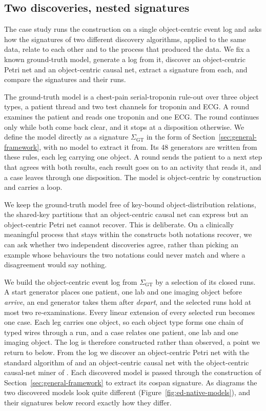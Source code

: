 \subsection{Two discoveries, nested signatures}\label{subsec:recovery}

The case study runs the construction on a single object-centric event log and asks
how the signatures of two different discovery algorithms, applied to the same data, relate to each
other and to the process that produced the data. We fix a known ground-truth model, generate a log
from it, discover an object-centric Petri net and an object-centric causal net, extract a signature
from each, and compare the signatures and their runs.

The ground-truth model is a chest-pain serial-troponin rule-out over three object types, a
patient thread and two test channels for troponin and ECG. A round examines the patient and reads one
troponin and one ECG. The round continues only while both come back clear, and it stops at a
disposition otherwise. We define the model directly as a signature $\Sigma_{\mathrm{GT}}$ in the form of
Section~\ref{sec:general-framework}, with no model to extract it from. Its 48 generators are written
from these rules, each leg carrying one object. A round sends the patient to a next step that agrees
with both results, each result goes on to an activity that reads it, and a case leaves through one
disposition. The model is object-centric by construction and carries a loop.

We keep the ground-truth model free of key-bound object-distribution relations, the
shared-key partitions that an object-centric causal net can express but an object-centric Petri net
cannot recover. This is deliberate. On a clinically meaningful process that stays within the
constructs both notations recover, we can ask whether two independent discoveries agree, rather than
picking an example whose behaviours the two notations could never match and where a disagreement
would say nothing.

We build the object-centric event log from $\Sigma_{\mathrm{GT}}$ by a selection of its closed
runs. A start generator places one patient, one lab and one imaging object before \emph{arrive}, an
end generator takes them after \emph{depart}, and the selected runs hold at most two
re-examinations. Every linear extension of every selected run becomes one case. Each leg carries one
object, so each object type forms one chain of typed wires through a run, and a case relates one
patient, one lab and one imaging object. The log is therefore constructed rather than observed, a
point we return to below. From the log we discover an object-centric Petri net with the
standard algorithm of \citet{vanderaalstDiscoveringObjectCentricPetri2020} and an object-centric
causal net with the object-centric causal-net miner of \citet{lissObjectCentricCausalNets2025}. Each discovered model is passed through the construction of
Section~\ref{sec:general-framework} to extract its cospan signature. As diagrams the two discovered
models look quite different (Figure~\ref{fig:ed-native-models}), and their signatures below
record exactly how they differ.

